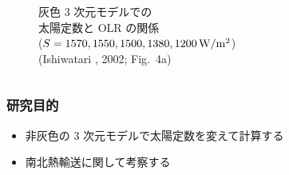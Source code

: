 \documentclass[aspectratio=149,9pt,fleqn]{beamer}
\begin{document}
\begin{frame}
\begin{columns}[b,onlytextwidth]
\begin{column}{.45\textwidth}
\begin{figure}
				灰色 3 次元モデルでの\\
				太陽定数と OLR の関係\\
				(\(S=1570, 1550, 1500, 1380, 1200\hmu{W/m^2}\))\\
				(Ishiwatari \etal*, 2002; Fig.\ 4a)
			\end{figure}
		\end{column}
	\end{columns}
\end{frame}


\begin{frame}
	\frametitle{研究目的}
	\begin{itemize}
		\item 非灰色の 3 次元モデルで太陽定数を変えて計算する
		\item 南北熱輸送に関して考察する
	\end{itemize}
\end{frame}
\end{document}
